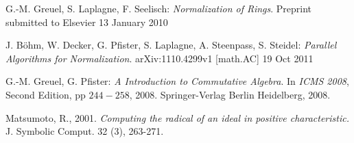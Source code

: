 \documentclass{article}
\begin{document}
\begin{thebibliography}{4}

G.-M. Greuel, S. Laplagne, F. Seelisch:
 {\em Normalization of Rings}. Preprint submitted to Elsevier 13 January 2010

J. B\"ohm, W. Decker, G. Pfister, S. Laplagne, A. Steenpass, S. Steidel:
 {\em Parallel Algorithms for Normalization}. arXiv:1110.4299v1 [math.AC] 19 Oct 2011

G.-M. Greuel, G. Pfister:
 {\em A {} Introduction to Commutative Algebra}.  
 In {\it ICMS 2008}, Second Edition, pp $244-258$, 2008. Springer-Verlag Berlin Heidelberg, 2008.
 
Matsumoto, R., 2001. {\em Computing the radical of an ideal in positive characteristic.} 
J. Symbolic Comput. 32 (3), 263-271.

\end{thebibliography}
\end{document}
